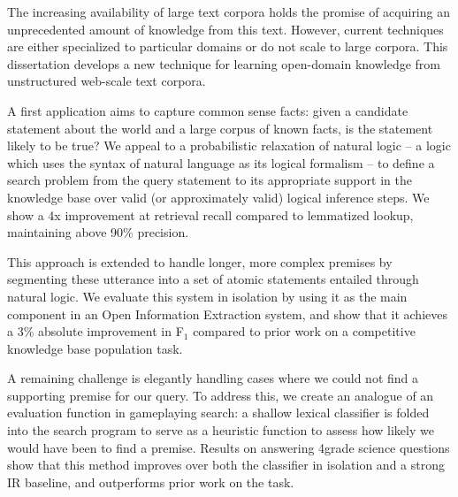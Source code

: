 
The increasing availability of large text corpora holds the promise of acquiring an 
  unprecedented amount of knowledge from this text.
However, current techniques are either specialized to particular domains or do not 
  scale to large corpora.
This dissertation develops a new technique for learning open-domain knowledge from 
  unstructured web-scale text corpora.

A first application aims to capture common sense facts: given a candidate statement 
  about the world and a large corpus of known facts, is the statement likely to be true? 
We appeal to a probabilistic relaxation of natural logic -- a logic which uses the syntax of 
  natural language as its logical formalism -- to define a search problem from the query 
  statement to its appropriate support in the knowledge base over valid (or approximately 
  valid) logical inference steps.
We show a 4x improvement at retrieval recall compared to lemmatized lookup, maintaining 
  above 90\% precision.

This approach is extended to handle longer, more complex premises by segmenting these 
  utterance into a set of atomic statements entailed through natural logic.
We evaluate this system in isolation by using it as the main component in an Open Information 
  Extraction system, and show that it achieves a 3\% absolute improvement in F$_1$ compared to 
  prior work on a competitive knowledge base population task.

A remaining challenge is elegantly handling cases where we could not find a supporting 
  premise for our query.
To address this, we create an analogue of an evaluation function in gameplaying search: 
  a shallow lexical classifier is folded into the search program to serve as a heuristic 
  function to assess how likely we would have been to find a premise.
Results on answering 4\nth grade science questions show that this method improves over 
  both the classifier in isolation and a strong IR baseline, and outperforms prior work
  on the task.


